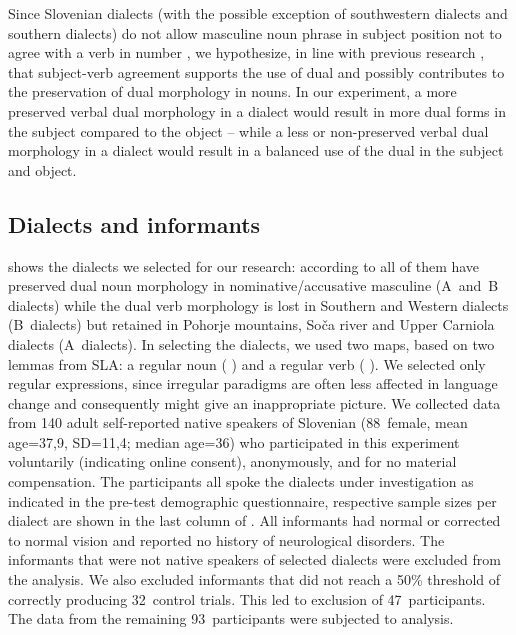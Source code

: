 \documentclass[output=paper,colorlinks,citecolor=brown]{langscibook}
\begin{document}
Since Slovenian dialects (with the possible exception of southwestern dialects and southern dialects) do not allow masculine noun phrase in subject position not to agree with a verb in number \citep{Jakop2008}, we hypothesize, in line with previous research \citep{Tesniere1925}, that subject-verb agreement supports the use of dual and possibly contributes to the preservation of dual morphology in nouns. In our experiment, a more preserved verbal dual morphology in a dialect would result in more dual forms in the subject compared to the object -- while a less or non-preserved verbal dual morphology in a dialect would result in a balanced use of the dual in the subject and object.

\subsection{Dialects and informants}\label{pav:sec:informants}
 shows the dialects we selected for our research: according to \citet{Jakop2008} all of them have preserved dual noun morphology in nominative/accusative masculine (A~and~B dialects) while the dual verb morphology is lost in Southern and Western dialects (B~dialects) but retained in Pohorje mountains, Soča river and Upper Carniola dialects (A~dialects). In selecting the dialects, we used  two maps, based on two lemmas from SLA: a regular noun ( ) and a regular verb ( ). We selected only regular expressions, since irregular paradigms are often less affected in language change and consequently might give an inappropriate picture.
We collected data from 140 adult self-reported native speakers of Slovenian (88~female, mean age=37,9, SD=11,4; median age=36) who participated in this experiment voluntarily (indicating online consent), anon\-ymously, and for no material compensation. The participants all spoke the dialects under investigation as indicated in the pre-test demographic questionnaire, respective sample sizes per dialect are shown in the last column of . All informants had normal or corrected to normal vision and reported no history of neurological disorders. The informants that were not native speakers of selected dialects were excluded from the analysis. We also excluded informants that did not reach a 50\% threshold of correctly producing 32~control trials. This led to exclusion of 47~participants. The data from the remaining 93~participants were subjected to analysis.
\end{document}

